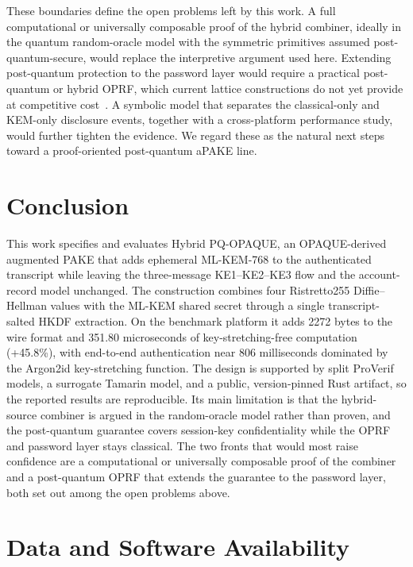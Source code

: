 \documentclass[preprint,12pt]{elsarticle}
\theoremstyle{remark}
\begin{document}
These boundaries define the open problems left by this work. A full
computational or universally composable proof of the hybrid combiner, ideally in
the quantum random-oracle model with the symmetric primitives assumed
post-quantum-secure, would replace the interpretive argument used here.
Extending post-quantum protection to the password layer would require a
practical post-quantum or hybrid OPRF, which current lattice constructions do
not yet provide at competitive cost~\cite{esgin2024}. A symbolic model that
separates the classical-only and KEM-only disclosure events, together with a
cross-platform performance study, would further tighten the evidence. We regard
these as the natural next steps toward a proof-oriented post-quantum aPAKE line.

\section{Conclusion}

This work specifies and evaluates Hybrid PQ-OPAQUE, an OPAQUE-derived augmented
PAKE that adds ephemeral ML-KEM-768 to the authenticated transcript while leaving
the three-message KE1--KE2--KE3 flow and the account-record model unchanged. The
construction combines four Ristretto255 Diffie--Hellman values with the ML-KEM
shared secret through a single transcript-salted HKDF extraction. On the
benchmark platform it adds 2272 bytes to the wire format and 351.80
microseconds of key-stretching-free computation (+45.8\%), with
end-to-end authentication near 806 milliseconds dominated by the Argon2id
key-stretching function. The design is supported by split ProVerif models, a
surrogate Tamarin model, and a public, version-pinned Rust artifact, so the
reported results are reproducible. Its main limitation is that the hybrid-source
combiner is argued in the random-oracle model rather than proven, and the
post-quantum guarantee covers session-key confidentiality while the OPRF and
password layer stays classical. The two fronts that would most raise confidence are a computational or
universally composable proof of the combiner and a post-quantum OPRF that extends
the guarantee to the password layer, both set out among the open problems above.

\section*{Data and Software Availability}
\end{document}
